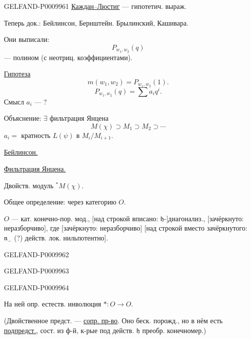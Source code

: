 \begin{GelfandAdjacentEvidence}{GELFAND-P000996}{1}
\underline{Каждан--Люстиг} --- гипотетич. выраж.

Теперь док.: Бейлинсон, Бернштейн. Брылинский, Кашивара.

Они выписали:
\[
P_{w_1,w_2}(q)
\]
--- полином (с неотриц. коэффициентами).

\underline{Гипотеза}
\[
m(w_1,w_2)=P_{w_1,w_2}(1).
\]
\[
P_{w_1,w_2}(q)=\sum a_iq^i.
\]
Смысл $a_i$ --- ?

Объяснение: $\exists$ фильтрация Янцена
\[
M(\chi)\supset M_1\supset M_2\supset\cdots
\]
$a_i={}$ кратность $L(\psi)$ в $M_i/M_{i+1}$.

\underline{Бейлинсон.}

\underline{Фильтрация Янцена.}

Двойств. модуль \({}^*M(\chi)\).

Общее определение: через категорию $O$.

$O$ --- кат. конечно-пор. мод., [над строкой вписано: $\mathfrak h$-]диагонализ., [зачёркнуто: неразборчиво], где [зачёркнуто: неразборчиво] [над строкой вместо зачёркнутого: $\mathfrak n_-$ (?) действ. лок. нильпотентно].
\end{GelfandAdjacentEvidence}
\begin{GelfandAdjacentEvidence}{GELFAND-P000996}{2}

\end{GelfandAdjacentEvidence}
\begin{GelfandAdjacentEvidence}{GELFAND-P000996}{3}

\end{GelfandAdjacentEvidence}
\begin{GelfandAdjacentEvidence}{GELFAND-P000996}{4}


На ней опр. естеств. инволюция $*:O\longrightarrow O$.

(Двойственное предст. --- \underline{сопр. пр-во}. Оно беск. порожд., но в нём есть \underline{подпредст.}, сост. из ф-й, к-рые под действ. $\mathfrak h$ преобр. конечномер.)
\end{GelfandAdjacentEvidence}
